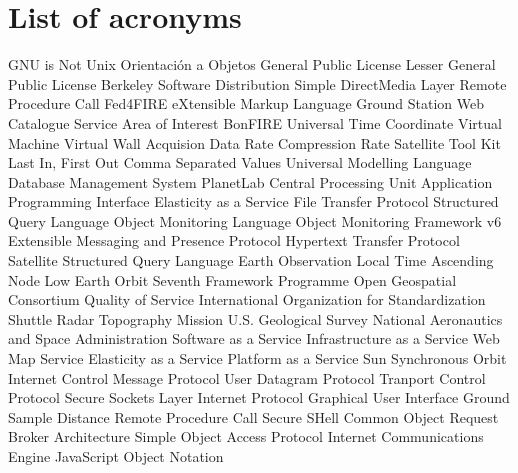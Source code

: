 \chapter{List of acronyms}

{\small
\begin{acronym}[XXXXXXXX]
       {\acs{GNU} is Not Unix}
        {Orientación a Objetos}
   {General Public License}
   {Lesser General Public License}
   {Berkeley Software Distribution}
   {Simple DirectMedia Layer}
       {Remote Procedure Call}
       {Fed4FIRE}
      {eXtensible Markup Language}
      {Ground Station}
       {Web Catalogue Service}
      {Area of Interest}
       {BonFIRE}
     {Universal Time Coordinate}
      {Virtual Machine}
      {Virtual Wall}
     {Acquision Data Rate}
      {Compression Rate}
     {Satellite Tool Kit}
    {Last In, First Out}
     {Comma Separated Values}
     {Universal Modelling Language}
    {Database Management System}
      {PlanetLab}
     {Central Processing Unit}
   {Application Programming Interface}
    {Elasticity as a Service}
     {File Transfer Protocol}
   {Structured Query Language}
   {Object Monitoring Language}
   {Object Monitoring Framework v6}
   {Extensible Messaging and Presence Protocol}
    {Hypertext Transfer Protocol}
     {Satellite}
     {Structured Query Language}
   {Earth Observation}
   {Local Time Ascending Node}
   {Low Earth Orbit}
   {Seventh Framework Programme}
   {Open Geospatial Consortium}
   {Quality of Service}
   {International Organization for Standardization}
   {Shuttle Radar Topography Mission}
   {U.S. Geological Survey}
   {National Aeronautics and Space Administration}
   {Software as a Service}
   {Infrastructure as a Service}
   {Web Map Service}
   {Elasticity as a Service}
   {Platform as a Service}
   {Sun Synchronous Orbit}
   {Internet Control Message Protocol}
   {User Datagram Protocol}
   {Tranport Control Protocol}
   {Secure Sockets Layer}
   {Internet Protocol}
   {Graphical User Interface}
   {Ground Sample Distance}
   {Remote Procedure Call}
   {Secure SHell}
   {Common Object Request Broker Architecture}
   {Simple Object Access Protocol}
   {Internet Communications Engine}
   {JavaScript Object Notation}
\end{acronym}
}




